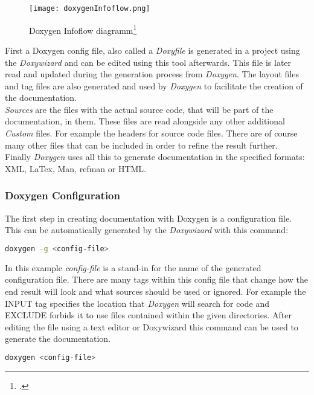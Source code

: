 \begin{figure}[H]
	\centering
	\texttt{[image: doxygenInfoflow.png]} 
	\caption{Doxygen Infoflow diagramm\footcite{doxygen_main_site}}
	\label{fig:doxygenInfoflow}
\end{figure}

First a Doxygen config file, also called a \textit{Doxyfile} is generated in a project using the \textit{Doxywizard} and can be edited using this tool afterwards. 
This file is later read and updated during the generation process from \textit{Doxygen}. The layout files and tag files are also generated and used by \textit{Doxygen}
to facilitate the creation of the documentation.\\

\textit{Sources} are the files with the actual source code, that will be part of the documentation, in them. These files are read alongside any other additional \textit{Custom}
files. For example the headers for source code files. There are of course many other files that can be included in order to refine the result further.\\

Finally \textit{Doxygen} uses all this to generate documentation in the specified formats: XML, LaTex, Man, refman or HTML. \\

\subsubsection{Doxygen Configuration}
The first step in creating documentation with Doxygen is a configuration file. This can be automatically generated by the \textit{Doxywizard} with this command:

\begin{lstlisting}[language=bash]
    doxygen -g <config-file>
\end{lstlisting}

In this example \textit{config-file} is a stand-in for the name of the generated configuration file. There are many tags within this config file that change how 
the end result will look and what sources should be used or ignored. For example the INPUT tag specifies the location that \textit{Doxygen} will search for code and
EXCLUDE forbids it to use files contained within the given directories. After editing the file using a text editor or Doxywizard this command can be used to generate 
the documentation.

\begin{lstlisting}[language=bash]
    doxygen <config-file>
\end{lstlisting}

